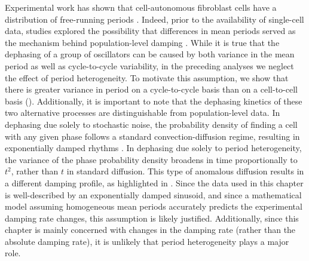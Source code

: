 Experimental work has shown that cell-autonomous fibroblast cells have a distribution of free-running periods \cite{Leise2012}.
Indeed, prior to the availability of single-cell data, studies explored the possibility that differences in mean periods served as the mechanism behind population-level damping \cite{Izumo2003}.
While it is true that the dephasing of a group of oscillators can be caused by both variance in the mean period as well as cycle-to-cycle variability, in the preceding analyses we neglect the effect of period heterogeneity.
To motivate this assumption, we show that there is greater variance in period on a cycle-to-cycle basis than on a cell-to-cell basis ().
Additionally, it is important to note that the dephasing kinetics of these two alternative processes are distinguishable from population-level data.
In dephasing due solely to stochastic noise, the probability density of finding a cell with any given phase follows a standard convection-diffusion regime, resulting in exponentially damped rhythms \cite{St.John2014a}.
In dephasing due solely to period heterogeneity, the variance of the phase probability density broadens in time proportionally to $t^2$, rather than $t$ in standard diffusion.
This type of anomalous diffusion results in a different damping profile, as highlighted in .
Since the data used in this chapter is well-described by an exponentially damped sinusoid, and since a mathematical model assuming homogeneous mean periods accurately predicts the experimental damping rate changes, this assumption is likely justified.
Additionally, since this chapter is mainly concerned with changes in the damping rate (rather than the absolute damping rate), it is unlikely that period heterogeneity plays a major role.

